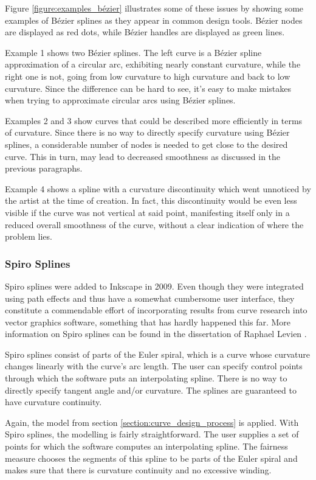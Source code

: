 \documentclass[a4paper]{article}
\begin{document}
				Figure \ref{figure:examples_bézier} illustrates some of these issues by showing some examples of Bézier splines as they appear in common design tools. Bézier nodes are displayed as red dots, while Bézier handles are displayed as green lines.

				Example 1 shows two Bézier splines. The left curve is a Bézier spline approximation of a circular arc, exhibiting nearly constant curvature, while the right one is not, going from low curvature to high curvature and back to low curvature. Since the difference can be hard to see, it's easy to make mistakes when trying to approximate circular arcs using Bézier splines.

				Examples 2 and 3 show curves that could be described more efficiently in terms of curvature. Since there is no way to directly specify curvature using Bézier splines, a considerable number of nodes is needed to get close to the desired curve. This in turn, may lead to decreased smoothness as discussed in the previous paragraphs.

				Example 4 shows a spline with a curvature discontinuity which went unnoticed by the artist at the time of creation. In fact, this discontinuity would be even less visible if the curve was not vertical at said point, manifesting itself only in a reduced overall smoothness of the curve, without a clear indication of where the problem lies.

			\subsubsection{Spiro Splines}
			\label{section:spiro_splines}

				Spiro splines were added to Inkscape in 2009. Even though they were integrated using path effects and thus have a somewhat cumbersome user interface, they constitute a commendable effort of incorporating results from curve research into vector graphics software, something that has hardly happened this far. More information on Spiro splines can be found in the dissertation of Raphael Levien \cite{thesis-spiro}.

				Spiro splines consist of parts of the Euler spiral, which is a curve whose curvature changes linearly with the curve's arc length. The user can specify control points through which the software puts an interpolating spline. There is no way to directly specify tangent angle and/or curvature. The splines are guaranteed to have curvature continuity.

				Again, the model from section \ref{section:curve_design_process} is applied. With Spiro splines, the modelling is fairly straightforward. The user supplies a set of points for which the software computes an interpolating spline. The fairness measure chooses the segments of this spline to be parts of the Euler spiral and makes sure that there is curvature continuity and no excessive winding.
\end{document}
